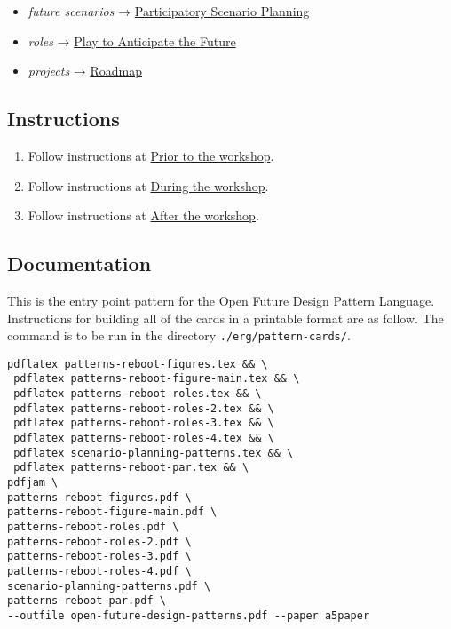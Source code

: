 \documentclass{article}
\begin{document}
\begin{itemize}
\item \emph{future scenarios} →  \hyperref[95072d03-1359-4863-bad1-651191eb2f38]{Participatory Scenario Planning}
\end{itemize}

\begin{itemize}
\item \emph{roles} →  \hyperref[85fefbc1-ca57-46fa-a8b2-154821a56c75]{Play to Anticipate the Future}
\end{itemize}

\begin{itemize}
\item \emph{projects} →  \hyperref[92e18906-d0e6-4e73-a9cf-fbdad931f3cf]{Roadmap}
\end{itemize}

\subsection{Instructions}

\begin{enumerate}
\item Follow instructions at \hyperref[9accd402-6d28-4ee2-ac35-44b4fe682d53]{Prior to the workshop}.
\item Follow instructions at \hyperref[c8823bc4-d08e-4486-9841-c914bba9977e]{During the workshop}.
\item Follow instructions at \hyperref[3d0acf49-0c87-4aaa-94b3-84e5d926d58d]{After the workshop}.
\end{enumerate}

\subsection{Documentation}

This is the entry point pattern for the Open Future Design Pattern
Language.  Instructions for building all of the cards in a printable
format are as follow.  The command is to be run in the directory
\texttt{./erg/pattern-cards/}.

\begin{verbatim}
pdflatex patterns-reboot-figures.tex && \
 pdflatex patterns-reboot-figure-main.tex && \
 pdflatex patterns-reboot-roles.tex && \
 pdflatex patterns-reboot-roles-2.tex && \
 pdflatex patterns-reboot-roles-3.tex && \
 pdflatex patterns-reboot-roles-4.tex && \
 pdflatex scenario-planning-patterns.tex && \
 pdflatex patterns-reboot-par.tex && \
pdfjam \
patterns-reboot-figures.pdf \
patterns-reboot-figure-main.pdf \
patterns-reboot-roles.pdf \
patterns-reboot-roles-2.pdf \
patterns-reboot-roles-3.pdf \
patterns-reboot-roles-4.pdf \
scenario-planning-patterns.pdf \
patterns-reboot-par.pdf \
--outfile open-future-design-patterns.pdf --paper a5paper
\end{verbatim}
\end{document}
